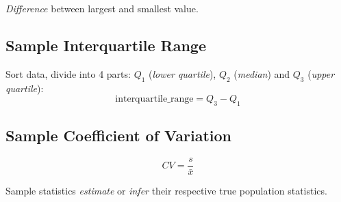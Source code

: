 \textit{Difference} between largest and smallest value.

\subsection*{Sample Interquartile Range}

Sort data, divide into 4 parts: $Q_1$ (\textit{lower quartile}), $Q_2$ (\textit{median}) and $Q_3$ (\textit{upper quartile}):
\begin{equation*}
    \text{interquartile\_range} = Q_3 - Q_1
\end{equation*}

\subsection*{Sample Coefficient of Variation}

\begin{equation*}
    CV = \frac{s}{\bar{x}}
\end{equation*}

\begin{remark}
    Sample statistics \textit{estimate} or \textit{infer} their respective true population statistics.
\end{remark}
